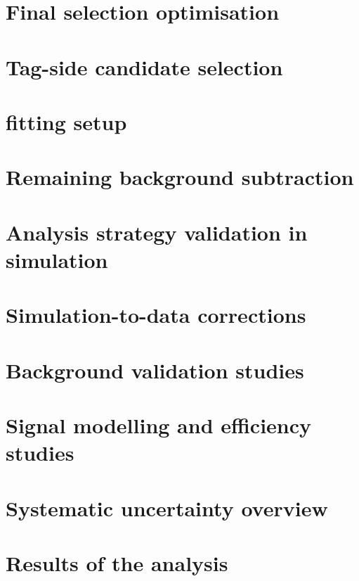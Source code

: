 \section{Final selection optimisation}\label{sec:final_optimisation}


\section{Tag-side \texorpdfstring{\B}{B} candidate selection}\label{sec:tag_selection}


\section{\texorpdfstring{\Mbc}{Mbc} fitting setup}\label{sec:fitting_mbc}


\section{Remaining \texorpdfstring{\BB}{BB} background subtraction}\label{sec:background_subtraction}


\section{Analysis strategy validation in simulation}\label{sec:MC_validation}


\section{Simulation-to-data corrections}\label{sec:corrections}


\section{Background validation studies}\label{sec:validation}


\section{Signal modelling and efficiency studies}\label{sec:signal_modelling}


\section{Systematic uncertainty overview}\label{sec:systematic_uncertainty}


\section{Results of the analysis}\label{sec:results}
